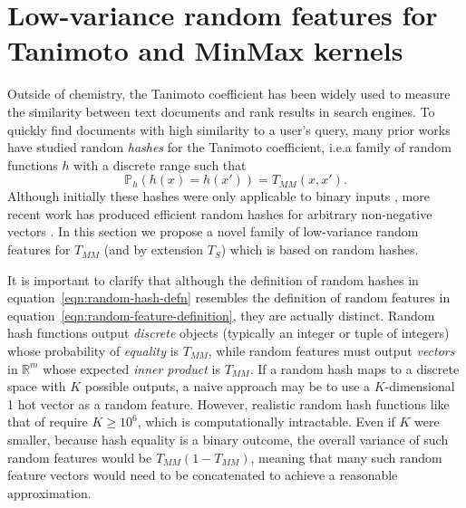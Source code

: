 \documentclass{article}
\theoremstyle{plain}
\theoremstyle{definition}
\theoremstyle{remark}
\renewcommand{\Pr}{\mathbb{P}}
\begin{document}
\section{Low-variance random features for Tanimoto and MinMax kernels}\label{sec:minmax-rf}

Outside of chemistry, the Tanimoto coefficient has been widely used to measure the similarity
between text documents
and rank results in search engines.
To quickly find documents with high similarity to a user's query,
many prior works have studied random
\emph{hashes} for the Tanimoto coefficient,
i.e.\@ a family of random functions $h$ with a discrete range such that
\begin{equation}\label{eqn:random-hash-defn}
    \Pr_h \left( h(x) = h(x') \right) = T_{MM}(x,x').
\end{equation}
Although initially these hashes were only applicable to binary inputs
\citep{broder1997resemblance,broder1998min,charikar2002similarity},
more recent work has produced efficient random hashes for arbitrary non-negative vectors
\citep{manasse2010consistent,ioffe2010improved,shrivastava2016simple}.
In this section we propose a novel family of low-variance random features for $T_{MM}$
(and by extension $T_{S}$) which is based on random hashes.

It is important to clarify that although the definition of random hashes in equation~\ref{eqn:random-hash-defn}
resembles the definition of random features in equation~\ref{eqn:random-feature-definition},
they are actually distinct.
Random hash functions output \emph{discrete} objects (typically an integer or tuple of integers)
whose probability of \emph{equality} is $T_{MM}$,
while random features must output \emph{vectors} in $\mathbb{R}^m$ whose expected \emph{inner product}
is $T_{MM}$.
If a random hash maps to a discrete space with $K$ possible outputs,
a naive approach may be to use a $K$-dimensional 1 hot vector as a random feature.
However, realistic random hash functions like that of \citet{ioffe2010improved}
require $K\ge 10^6$,
which is computationally intractable.
Even if $K$ were smaller,
because hash equality is a binary outcome,
the overall variance of such random features would be $T_{MM}\left(1-T_{MM}\right)$,
meaning that many such random feature vectors would need to be concatenated to achieve a reasonable approximation.
\end{document}
